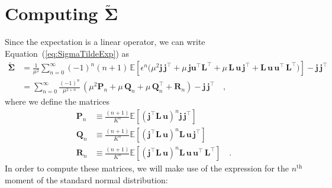 
\appendix

\section{Computing $\tilde{\pmb{\Sigma}}$}
%
Since the expectation is a linear operator, we can write Equation~(\ref{eq:SigmaTildeExp})
as
%
\begin{align}
    \tilde{\pmb{\Sigma}}
     & =
    \frac{1}{\mu^2}
    \sum\limits_{n=0}^\infty
    (-1)^n (n + 1)
    \,
    \mathbb{E}\left[
        \epsilon^n
        \Bigg(
        \mu^2 \mathbf{j} \, \mathbf{j}^\top
        +
        \mu \, \mathbf{j}\mathbf{u}^\top \mathbf{L}^\top
        +
        \mu \, \mathbf{L} \, \mathbf{u} \, \mathbf{j}^\top
        +
        \mathbf{L} \, \mathbf{u} \, \mathbf{u}^\top \, \mathbf{L}^\top
        \Bigg)
        \right]
    - \mathbf{j} \, \mathbf{j}^\top
    \nonumber \\[0.5em]
     & =
    \sum\limits_{n=0}^\infty
    \frac{(-1)^n}{\mu^{2 + n}}
    \,
    \left(
    \mu^2 \mathbf{P}_n
    +
    \mu \, \mathbf{Q}_n
    +
    \mu \, \mathbf{Q}_n^\top
    +
    \mathbf{R}_n
    \right)
    - \mathbf{j} \, \mathbf{j}^\top
    \quad,
\end{align}
%
where we define the matrices
%
\begin{align}
    \mathbf{P}_n & \equiv \frac{(n + 1)}{K^n}\mathbb{E}\left[ \left(\mathbf{j}^\top \mathbf{L} \, \mathbf{u}\right)^n \mathbf{j} \, \mathbf{j}^\top \right]
    \nonumber                                                                                                                                                                                \\[0.5em]
    \mathbf{Q}_n & \equiv \frac{(n + 1)}{K^n}\mathbb{E}\left[ \left(\mathbf{j}^\top \mathbf{L} \, \mathbf{u}\right)^n \mathbf{L} \, \mathbf{u} \, \mathbf{j}^\top \right]
    \nonumber                                                                                                                                                                                \\[0.5em]
    \mathbf{R}_n & \equiv \frac{(n + 1)}{K^n}\mathbb{E}\left[ \left(\mathbf{j}^\top \mathbf{L} \, \mathbf{u}\right)^n \mathbf{L} \, \mathbf{u} \, \mathbf{u}^\top \, \mathbf{L}^\top \right]
    \quad.
\end{align}
%
In order to compute these matrices,
we will make use of the expression for the
$n^\mathrm{th}$ moment of the standard normal distribution:
